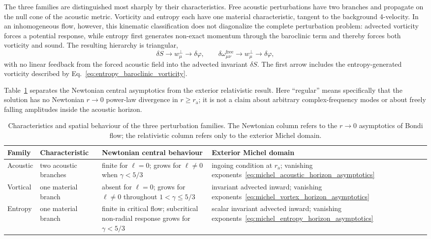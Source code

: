 \documentclass[12pt,a4paper,preprint,nopreprintline]{elsarticle}
\begin{document}
The three families are distinguished most sharply by their characteristics. Free acoustic perturbations have two branches and propagate on the null cone of the acoustic metric. Vorticity and entropy each have one material characteristic, tangent to the background 4-velocity. In an inhomogeneous flow, however, this kinematic classification does not diagonalize the complete perturbation problem: advected vorticity forces a potential response, while entropy first generates non-exact momentum through the baroclinic term and thereby forces both vorticity and sound. The resulting hierarchy is triangular,
\begin{equation}
    \delta S
    \longrightarrow
    w_{\mu}^{\perp}
    \longrightarrow
    \delta\varphi,
    \qquad
    \delta\omega_{\mu\nu}^{\mathrm{free}}
    \longrightarrow
    w_{\mu}^{\perp}
    \longrightarrow
    \delta\varphi,
    \label{eq:mode_coupling_hierarchy}
\end{equation}
with no linear feedback from the forced acoustic field into the advected invariant $\delta S$. The first arrow includes the entropy-generated vorticity described by Eq.~\eqref{eq:entropy_baroclinic_vorticity}.

Table~\ref{tab:mode_stability_summary} separates the Newtonian central asymptotics from the exterior relativistic result. Here ``regular'' means specifically that the solution has no Newtonian $r\rightarrow0$ power-law divergence in $r\geq r_{\mathrm{a}}$; it is not a claim about arbitrary complex-frequency modes or about freely falling amplitudes inside the acoustic horizon.

\begin{table}[ht]
\centering
\caption{Characteristics and spatial behaviour of the three perturbation families. The Newtonian column refers to the $r\rightarrow0$ asymptotics of Bondi flow; the relativistic column refers only to the exterior Michel domain.}
\label{tab:mode_stability_summary}
\small
\setlength{\tabcolsep}{4pt}
\renewcommand{\arraystretch}{1.15}
\begin{tabular}{
    >{\raggedright\arraybackslash}p{2.8cm}
    >{\raggedright\arraybackslash}p{2.5cm}
    >{\raggedright\arraybackslash}p{4.8cm}
    >{\raggedright\arraybackslash}p{4.7cm}}
\toprule
Family & Characteristic & Newtonian central behaviour & Exterior Michel domain \\
\midrule
Acoustic & two acoustic branches & finite for $\ell=0$; grows for $\ell\neq0$ when $\gamma<5/3$ & ingoing condition at $r_{\mathrm{a}}$; vanishing exponents~\eqref{eq:michel_acoustic_horizon_asymptotics} \\
Vortical & one material branch & absent for $\ell=0$; grows for $\ell\neq0$ throughout $1<\gamma\leq5/3$ & invariant advected inward; vanishing exponents~\eqref{eq:michel_vortex_horizon_asymptotics} \\
Entropy & one material branch & finite in critical flow; subcritical non-radial response grows for $\gamma<5/3$ & scalar invariant advected inward; vanishing exponents~\eqref{eq:michel_entropy_horizon_asymptotics} \\
\bottomrule
\end{tabular}
\end{table}
\end{document}
